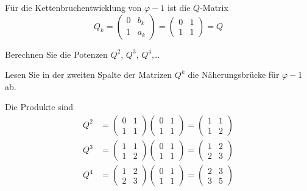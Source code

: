 Für die Kettenbruchentwicklung von $\varphi-1$ ist die $Q$-Matrix
\[
Q_k
=
\begin{pmatrix}
0&b_k\\
1&a_k
\end{pmatrix}
=
\begin{pmatrix}
0&1\\
1&1
\end{pmatrix}
=
Q
\]
\begin{teilaufgaben}
\item
Berechnen Sie die Potenzen  $Q^2$, $Q^3$, $Q^4$,\dots
\item
Lesen Sie in der zweiten Spalte der Matrizen $Q^k$ die Näherungsbrücke 
für $\varphi-1$ ab.
\end{teilaufgaben}

\begin{loesung}
\begin{teilaufgaben}
Die Produkte sind
\begin{align*}
Q^2
&=
\begin{pmatrix}
0&1\\
1&1
\end{pmatrix}
\begin{pmatrix}
0&1\\
1&1
\end{pmatrix}
=
\begin{pmatrix}
1 & 1 \\
1 & 2
\end{pmatrix}
\\
Q^3
&=
\begin{pmatrix}
1&1\\
1&2
\end{pmatrix}
\begin{pmatrix}
0&1\\
1&1
\end{pmatrix}
=
\begin{pmatrix}
1 & 2 \\
2 & 3
\end{pmatrix}
\\
Q^4
&=
\begin{pmatrix}
1 & 2 \\
2 & 3
\end{pmatrix}
\begin{pmatrix}
0&1\\
1&1
\end{pmatrix}
=
\begin{pmatrix}
 2 & 3 \\
 3 & 5
\end{pmatrix}
\\

\end{align*}
\end{teilaufgaben}
\end{loesung}
